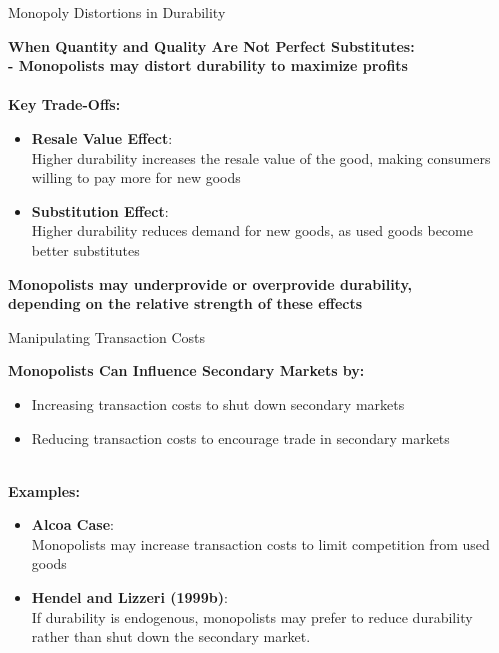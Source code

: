 \documentclass[aspectratio=169]{beamer}  %
\begin{document}
\begin{frame}{Monopoly Distortions in Durability}{}
\begin{spacing}{1.25}
{\small
    \textbf{When Quantity and Quality Are Not Perfect Substitutes:}\\
     \textbf{\quad - Monopolists may distort durability to maximize profits}\\
\quad\\
    \textbf{Key Trade-Offs:}
    \begin{itemize}
        \item \textbf{Resale Value Effect}: \\
        Higher durability increases the resale value of the good, making consumers willing to pay more for new goods
        \item \textbf{Substitution Effect}:\\
        Higher durability reduces demand for new goods, as used goods become better substitutes
    \end{itemize}

    \textbf{Monopolists may underprovide or overprovide durability,\\ depending on the relative strength of these effects}

    }
\end{spacing}
\end{frame}

\begin{frame}{Manipulating Transaction Costs}{}
\begin{spacing}{1.25}
{\small
   \textbf{Monopolists Can Influence Secondary Markets by:}
    \begin{itemize}
        \item Increasing transaction costs to shut down secondary markets
        \item Reducing transaction costs to encourage trade in secondary markets
    \end{itemize}
\quad\\
    \textbf{Examples:}
    \begin{itemize}
        \item \textbf{Alcoa Case}:\\
        Monopolists may increase transaction costs to limit competition from used goods
        \item \textbf{Hendel and Lizzeri (1999b)}: \\
        If durability is endogenous, monopolists may prefer to reduce durability rather than shut down the secondary market.
    \end{itemize}

    }
\end{spacing}
\end{frame}
\end{document}

